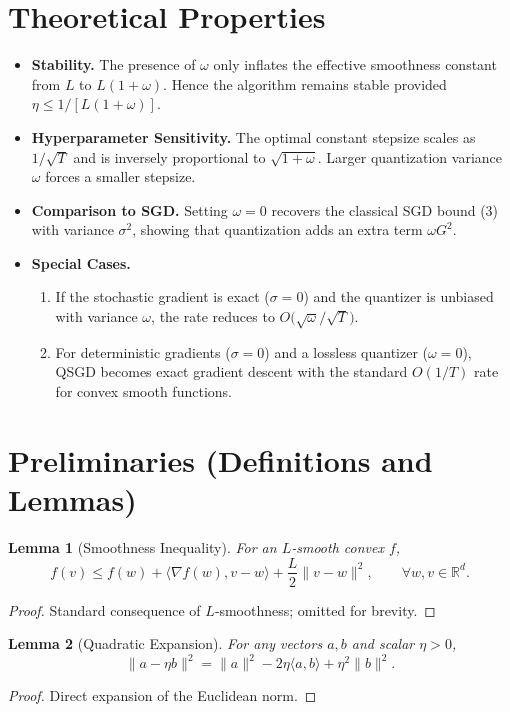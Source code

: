 \documentclass{article}
\newtheorem{lemma}{Lemma}
\newcommand{\R}{\mathbb{R}}
\begin{document}
\section*{Theoretical Properties}
\begin{itemize}
\item \textbf{Stability.} The presence of $\omega$ only inflates the effective smoothness constant from $L$ to $L(1+\omega)$. Hence the algorithm remains stable provided $\eta\le1/[L(1+\omega)]$.
\item \textbf{Hyperparameter Sensitivity.} The optimal constant stepsize scales as $1/\sqrt{T}$ and is inversely proportional to $\sqrt{1+\omega}$. Larger quantization variance $\omega$ forces a smaller stepsize.
\item \textbf{Comparison to SGD.} Setting $\omega=0$ recovers the classical SGD bound (3) with variance $\sigma^{2}$, showing that quantization adds an extra term $\omega G^{2}$.
\item \textbf{Special Cases.}
  \begin{enumerate}
  \item If the stochastic gradient is exact ($\sigma=0$) and the quantizer is unbiased with variance $\omega$, the rate reduces to $O\!\big(\sqrt{\omega}/\sqrt{T}\big)$.
  \item For deterministic gradients ($\sigma=0$) and a lossless quantizer ($\omega=0$), QSGD becomes exact gradient descent with the standard $O(1/T)$ rate for convex smooth functions.
  \end{enumerate}
\end{itemize}

\section*{Preliminaries (Definitions and Lemmas)}
\begin{lemma}[Smoothness Inequality]
\label{lem:smooth}
For an $L$‑smooth convex $f$,
\[
f(v)\le f(w)+\langle\nabla f(w),v-w\rangle+\frac{L}{2}\|v-w\|^{2},
\qquad \forall w,v\in\R^{d}.
\tag{5}
\]
\end{lemma}
\begin{proof}
Standard consequence of $L$‑smoothness; omitted for brevity. \qedhere
\end{proof}

\begin{lemma}[Quadratic Expansion]
\label{lem:expansion}
For any vectors $a,b$ and scalar $\eta>0$,
\[
\|a-\eta b\|^{2}= \|a\|^{2}-2\eta\langle a,b\rangle+\eta^{2}\|b\|^{2}.
\tag{6}
\]
\end{lemma}
\begin{proof}
Direct expansion of the Euclidean norm. \qedhere
\end{proof}
\end{document}
